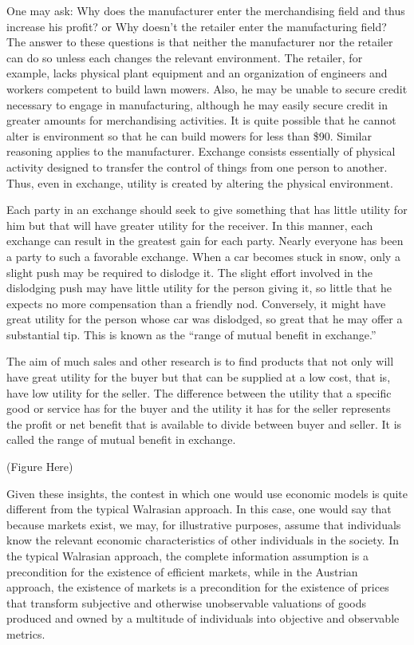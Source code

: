 One may ask: Why does the manufacturer enter the merchandising field and thus increase his profit? or Why doesn’t the retailer enter the manufacturing field?  The answer to these questions is that neither the manufacturer nor the retailer can do so unless each changes the relevant environment. The retailer, for example, lacks physical plant equipment and an organization of engineers and workers competent to build lawn mowers. Also, he may be unable to secure credit necessary to engage in manufacturing, although he may easily secure credit in greater amounts for merchandising activities. It is quite possible that he cannot alter is environment so that he can build mowers for less than \$90. Similar reasoning applies to the manufacturer. Exchange consists essentially of physical activity designed to transfer the control of things from one person to another. Thus, even in exchange, utility is created by altering the physical environment.

Each party in an exchange should seek to give something that has little utility for him but that will have greater utility for the receiver. In this manner, each exchange can result in the greatest gain for each party. Nearly everyone has been a party to such a favorable exchange. When a car becomes stuck in snow, only a slight push may be required to dislodge it. The slight effort involved in the dislodging push may have little utility for the person giving it, so little that he expects no more compensation than a friendly nod. Conversely, it might have great utility for the person whose car was dislodged, so great that he may offer a substantial tip. This is known as the ``range of mutual benefit in exchange.''

The aim of much sales and other research is to find products that not only will have great utility for the buyer but that can be supplied at a low cost, that is, have low utility for the seller. The difference between the utility that a specific good or service has for the buyer and the utility it has for the seller represents the profit or net benefit that is available to divide between buyer and seller. It is called the range of mutual benefit in exchange.

(Figure Here)

Given these insights, the contest in which one would use economic models is quite different from the typical Walrasian approach. In this case, one would say that because markets exist, we may, for illustrative purposes, assume that individuals know the relevant economic characteristics of other individuals in the society. In the typical Walrasian approach, the complete information assumption is a precondition for the existence of efficient markets, while in the Austrian approach, the existence of markets is a precondition for the existence of prices that transform subjective and otherwise unobservable valuations of goods produced and owned by a multitude of individuals into objective and observable metrics.

